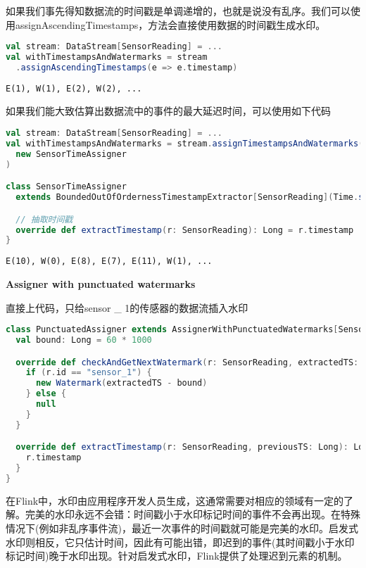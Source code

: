 \documentclass[oneside]{ctexbook}
\begin{document}
如果我们事先得知数据流的时间戳是单调递增的，也就是说没有乱序。我们可以使用assignAscendingTimestamps，方法会直接使用数据的时间戳生成水印。

\begin{lstlisting}[language=scala]
val stream: DataStream[SensorReading] = ...
val withTimestampsAndWatermarks = stream
  .assignAscendingTimestamps(e => e.timestamp)
\end{lstlisting}

\begin{lstlisting}
E(1), W(1), E(2), W(2), ...
\end{lstlisting}

如果我们能大致估算出数据流中的事件的最大延迟时间，可以使用如下代码

\begin{lstlisting}[language=scala]
val stream: DataStream[SensorReading] = ...
val withTimestampsAndWatermarks = stream.assignTimestampsAndWatermarks(
  new SensorTimeAssigner 
)

class SensorTimeAssigner
  extends BoundedOutOfOrdernessTimestampExtractor[SensorReading](Time.seconds(5)) {

  // 抽取时间戳
  override def extractTimestamp(r: SensorReading): Long = r.timestamp
}
\end{lstlisting}

\begin{lstlisting}
E(10), W(0), E(8), E(7), E(11), W(1), ...
\end{lstlisting}

\textbf{Assigner with punctuated watermarks}

直接上代码，只给sensor \_ 1的传感器的数据流插入水印

\begin{lstlisting}[language=scala]
class PunctuatedAssigner extends AssignerWithPunctuatedWatermarks[SensorReading] {
  val bound: Long = 60 * 1000

  override def checkAndGetNextWatermark(r: SensorReading, extractedTS: Long): Watermark = {
    if (r.id == "sensor_1") {
      new Watermark(extractedTS - bound)
    } else {
      null
    }
  }

  override def extractTimestamp(r: SensorReading, previousTS: Long): Long = {
    r.timestamp
  }
}
\end{lstlisting}

在Flink中，水印由应用程序开发人员生成，这通常需要对相应的领域有一定的了解。完美的水印永远不会错：时间戳小于水印标记时间的事件不会再出现。在特殊情况下(例如非乱序事件流)，最近一次事件的时间戳就可能是完美的水印。启发式水印则相反，它只估计时间，因此有可能出错，即迟到的事件(其时间戳小于水印标记时间)晚于水印出现。针对启发式水印，Flink提供了处理迟到元素的机制。
\end{document}
